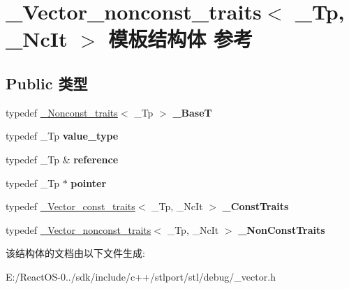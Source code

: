 \hypertarget{struct___vector__nonconst__traits}{}\section{\+\_\+\+Vector\+\_\+nonconst\+\_\+traits$<$ \+\_\+\+Tp, \+\_\+\+Nc\+It $>$ 模板结构体 参考}
\label{struct___vector__nonconst__traits}
\subsection*{Public 类型}
\begin{DoxyCompactItemize}
\item 
\mbox{\label{struct___vector__nonconst__traits_a66cefff2320b7e43cf17ba8725d752c1}} 
typedef \hyperlink{struct___nonconst__traits}{\+\_\+\+Nonconst\+\_\+traits}$<$ \+\_\+\+Tp $>$ {\bfseries \+\_\+\+BaseT}
\item 
\mbox{\label{struct___vector__nonconst__traits_ad404613486ac55e3e4b7433670c86ffe}} 
typedef \+\_\+\+Tp {\bfseries value\+\_\+type}
\item 
\mbox{\label{struct___vector__nonconst__traits_aa7a6b9b6a5419c797f8e161ab13fcbc5}} 
typedef \+\_\+\+Tp \& {\bfseries reference}
\item 
\mbox{\label{struct___vector__nonconst__traits_a43edb45403320c72a91a22d680d165b6}} 
typedef \+\_\+\+Tp $\ast$ {\bfseries pointer}
\item 
\mbox{\label{struct___vector__nonconst__traits_a94972561f5d5180c7c94cfedd2190130}} 
typedef \hyperlink{struct___vector__const__traits}{\+\_\+\+Vector\+\_\+const\+\_\+traits}$<$ \+\_\+\+Tp, \+\_\+\+Nc\+It $>$ {\bfseries \+\_\+\+Const\+Traits}
\item 
\mbox{\label{struct___vector__nonconst__traits_ac2f0231144a72e90f7213c4a6b83a9f7}} 
typedef \hyperlink{struct___vector__nonconst__traits}{\+\_\+\+Vector\+\_\+nonconst\+\_\+traits}$<$ \+\_\+\+Tp, \+\_\+\+Nc\+It $>$ {\bfseries \+\_\+\+Non\+Const\+Traits}
\end{DoxyCompactItemize}


该结构体的文档由以下文件生成\+:\begin{DoxyCompactItemize}
\item 
E\+:/\+React\+O\+S-\/0../sdk/include/c++/stlport/stl/debug/\+\_\+vector.\+h\end{DoxyCompactItemize}
